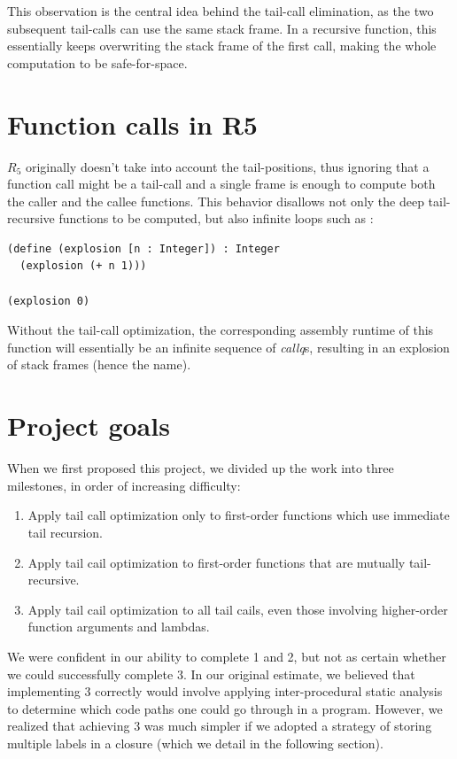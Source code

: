 \documentclass[12pt]{article}
\begin{document}
This observation is the central idea behind the tail-call elimination,
as the two subsequent tail-calls can use the same stack frame. In a
recursive function, this essentially keeps overwriting the stack frame
of the first call, making the whole computation to be safe-for-space.

\section{Function calls in R5}
$R_5$ originally doesn't take into account the tail-positions, thus
ignoring that a function call might be a tail-call and a single frame
is enough to compute both the caller and the callee functions. This
behavior disallows not only the deep tail-recursive functions to be
computed, but also infinite loops such as :

\begin{verbatim}
(define (explosion [n : Integer]) : Integer
  (explosion (+ n 1)))

(explosion 0)
\end{verbatim}

Without the tail-call optimization, the corresponding assembly runtime
of this function will essentially be an infinite sequence of
\emph{callq}s, resulting in an explosion of stack frames (hence the
name).

\section{Project goals}

When we first proposed this project, we divided up the work into three milestones,
in order of increasing difficulty:

\begin{enumerate}
 \item Apply tail call optimization only to first-order functions which use
       immediate tail recursion.
 \item Apply tail cail optimization to first-order functions that are mutually
       tail-recursive.
 \item  Apply tail cail optimization to all tail cails, even those involving
        higher-order function arguments and lambdas.
\end{enumerate}

We were confident in our ability to complete 1 and 2, but not as certain whether
we could successfully complete 3. In our original estimate, we believed that
implementing 3 correctly would involve applying inter-procedural static analysis
to determine which code paths one could go through in a program. However, we
realized that achieving 3 was much simpler if we adopted a strategy of storing
multiple labels in a closure (which we detail in the following section).
\end{document}
